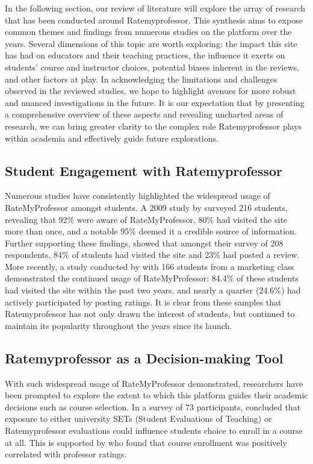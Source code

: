 \documentclass[doc, 12pt, twocolumn]{apa7}
\begin{document}


In the following section, our review of literature will explore the array of research that has been conducted around Ratemyprofessor. This synthesis aims to expose common themes and findings from numerous studies on the platform over the years. Several dimensions of this topic are worth exploring: the impact this site has had on educators and their teaching practices, the influence it exerts on students' course and instructor choices, potential biases inherent in the reviews, and other factors at play. In acknowledging the limitations and challenges observed in the reviewed studies, we hope to highlight avenues for more robust and nuanced investigations in the future. It is our expectation that by presenting a comprehensive overview of these aspects and revealing uncharted areas of research, we can bring greater clarity to the complex role Ratemyprofessor plays within academia and effectively guide future explorations.

\subsection{Student Engagement with Ratemyprofessor}
Numerous studies have consistently highlighted the widespread usage of RateMyProfessor amongst students. A 2009 study by \textcite{davison_how_2009} surveyed 216 students, revealing that 92\% were aware of RateMyProfessor, 80\% had visited the site more than once, and a notable 95\% deemed it a credible source of information. Further supporting these findings, \textcite{bleske-rechek_ratemyprofessors_2010} showed that amongst their survey of 208 respondents, 84\% of students had visited the site and 23\% had posted a review. More recently, a study conducted by \textcite{chiang_students_2017} with 166 students from a marketing class demonstrated the continued usage of RateMyProfessor: 84.4\% of these students had visited the site within the past two years, and nearly a quarter (24.6\%) had actively participated by posting ratings. It is clear from these samples that Ratemyprofessor has not only drawn the interest of students, but continued to maintain its popularity throughout the years since its launch.

\subsection{Ratemyprofessor as a Decision-making Tool}
With such widespread usage of RateMyProfessor demonstrated, researchers have been prompted to explore the extent to which this platform guides their academic decisions such as course selection. In a survey of 73 participants, \textcite{boswell_effects_2020} concluded that exposure to either university SETs (Student Evaluations of Teaching) or Ratemyprofessor evaluations could influence students choice to enroll in a course at all. This is supported by \textcite{johnson_i_2014} who found that course enrollment was positively correlated with professor ratings.
\end{document}
